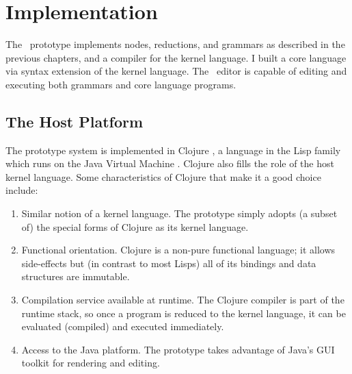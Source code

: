 \chapter{Implementation}
\label{prototype}

The \Meta\ prototype implements nodes, reductions, and grammars as described in the previous chapters, and a compiler for the kernel language. I built a core language via syntax extension of the kernel language. The \Meta\ editor is capable of editing and executing both grammars and core language programs.

\section{The Host Platform}
The prototype system is implemented in Clojure \cite{clojure}, a language in the Lisp family which runs on the Java Virtual Machine \cite{jvm}. Clojure also fills the role of the host kernel language. Some characteristics of Clojure that make it a good choice include:
\begin{enumerate}
\item Similar notion of a kernel language. The prototype simply adopts (a subset of) the special forms of Clojure as its kernel language.
\item Functional orientation. Clojure is a non-pure functional language; it allows side-effects but (in contrast to most Lisps) all of its bindings and data structures are immutable. %
\item Compilation service available at runtime. The Clojure compiler is part of the runtime stack, so once a program is reduced to the kernel language, it can be evaluated (compiled) and executed immediately.
\item Access to the Java platform. The prototype takes advantage of Java's GUI toolkit for rendering and editing.
\end{enumerate}

